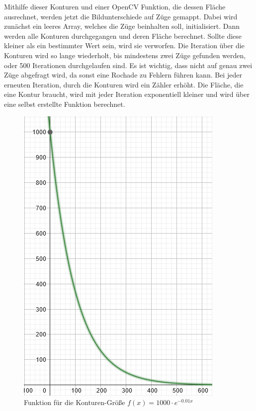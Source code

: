 Mithilfe dieser Konturen und einer OpenCV Funktion, die dessen Fläche ausrechnet, werden jetzt die Bildunterschiede auf Züge gemappt. 
Dabei wird zunächst ein leeres Array, welches die Züge beinhalten soll, initialisiert. Dann werden alle Konturen durchgegangen und deren Fläche berechnet.
Sollte diese kleiner als ein bestimmter Wert sein, wird sie verworfen. 
Die Iteration über die Konturen wird so lange wiederholt, bis mindestens zwei Züge gefunden werden, oder 500 Iterationen durchgelaufen sind. 
Es ist wichtig, dass nicht auf genau zwei Züge abgefragt wird, da sonst eine Rochade zu Fehlern führen kann.
Bei jeder erneuten Iteration, durch die Konturen wird ein Zähler erhöht. Die Fläche, die eine Kontur braucht, wird mit jeder Iteration exponentiell kleiner und wird 
über eine selbst erstellte Funktion berechnet.

\begin{figure}[H]
    \centering
    \includegraphics[scale=0.6]{images/contour_area_graph.png}
    \caption{Funktion für die Konturen-Größe $f(x) = 1000 \cdot e^{-0.01x}$}
\end{figure} 


